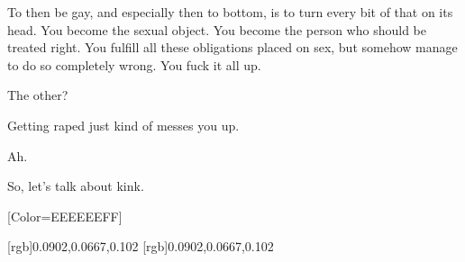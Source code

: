 \begin{paracol}{2}
\begin{leftcolumn}
To then be gay, and especially then to bottom, is to turn every bit of that on its head. You become the sexual object. You become the person who should be treated right. You fulfill all these obligations placed on sex, but somehow manage to do so completely wrong. You fuck it all up.

\begin{ally}
The other?
\end{ally}
Getting raped just kind of messes you up.

\begin{ally}
Ah.
\end{ally}
So, let's talk about kink.

\newpage
\end{leftcolumn}
\end{paracol}

\renewfontfamily{}[Color=EEEEEEFF]

[rgb]{0.0902,0.0667,0.102}
[rgb]{0.0902,0.0667,0.102}

